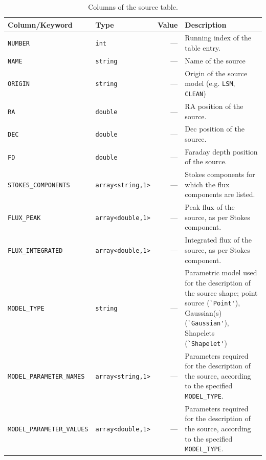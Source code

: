 \documentclass[a4paper,10pt,bibtotoc]{scrartcl}
\begin{document}
\begin{table}[htbp]
  \centering
  \begin{tabular}{|llrp{6.5cm}|}
    \hline
    \sc Column/Keyword & \sc Type & \sc Value & \sc Description \\
    \hline \hline
    \small\verb|NUMBER|    & \small\verb|int|    & --- & Running index
    of the table entry. \\ 
    \small\verb|NAME|      & \small\verb|string| & --- & Name of the source \\
    \small\verb|ORIGIN|    & \small\verb|string| & --- & Origin of the
    source model (e.g. \texttt{LSM}, \texttt{CLEAN}) \\
    \small\verb|RA|        & \small\verb|double| & --- & RA position of the source. \\
    \small\verb|DEC|       & \small\verb|double| & --- & Dec position of the source. \\
    \small\verb|FD|        & \small\verb|double| & --- & Faraday depth position of
    the source. \\
    \small\verb|STOKES_COMPONENTS| & \small\verb|array<string,1>|  &
    --- & Stokes components for which the flux components are listed. \\
    \small\verb|FLUX_PEAK| & \small\verb|array<double,1>| & --- & Peak flux of the
    source, as per Stokes component. \\
    \small\verb|FLUX_INTEGRATED| & \verb|array<double,1>| & --- & Integrated flux
    of the source, as per Stokes component. \\
    \small\verb|MODEL_TYPE| & \small\verb|string| & --- & Parametric
    model used for the description of the source shape; point source
    (\verb|`Point'|), Gaussian(s) (\verb|`Gaussian'|), Shapelets (\verb|`Shapelet'|) \\
    \small\verb|MODEL_PARAMETER_NAMES| & \small\verb|array<string,1>|
    & --- & Parameters required for the description of the source,
    according to the specified \verb|MODEL_TYPE|. \\
    \small\verb|MODEL_PARAMETER_VALUES| & \small\verb|array<double,1>|
    & --- & Parameters required for the description of the source,
    according to the specified \verb|MODEL_TYPE|. \\
    \hline
  \end{tabular}
  \caption{Columns of the source table.}
  \label{tab:source table columns}
\end{table}
\end{document}

